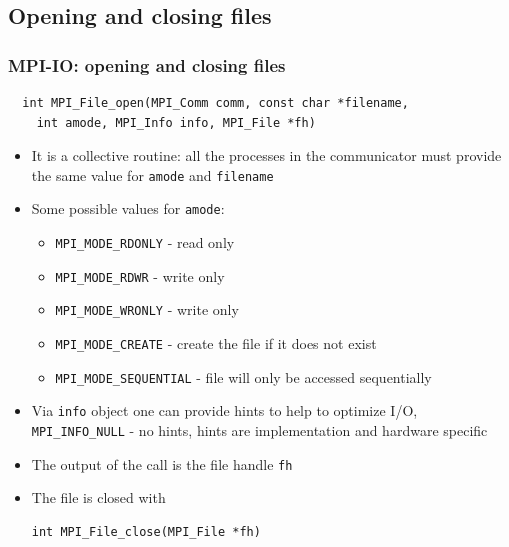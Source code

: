 \documentclass{beamer}
\begin{document}
\subsection{Opening and closing files}
\begin{frame}[fragile]
  \frametitle{MPI-IO: opening and closing files}
{\color{mycolorcode}
\begin{verbatim}
  int MPI_File_open(MPI_Comm comm, const char *filename, 
    int amode, MPI_Info info, MPI_File *fh)
\end{verbatim}
}
\begin{itemize}
\item It is a collective routine: all the processes in the communicator must provide the same value for {\color{mycolorcode}\verb|amode|} and {\color{mycolorcode}\verb|filename|}
\item Some possible values for {\color{mycolorcode}\verb|amode|}:
{\color{mycolorcode}
\begin{itemize}
\item {\color{mycolorcode}\verb|MPI_MODE_RDONLY|} - read only
\item {\color{mycolorcode}\verb|MPI_MODE_RDWR|} - write only
\item {\color{mycolorcode} \verb|MPI_MODE_WRONLY|} - write only
\item {\color{mycolorcode}\verb|MPI_MODE_CREATE|} - create the file if it does not exist
\item {\color{mycolorcode}\verb|MPI_MODE_SEQUENTIAL|} - file will only be accessed sequentially
\end{itemize}
}
\item Via {\color{mycolorcode}\verb|info|} object one can provide hints to help to optimize I/O, {\color{mycolorcode}\verb|MPI_INFO_NULL|} - no hints, hints are implementation and hardware specific 
\item The output of the call is the file handle {\color{mycolorcode}\verb|fh|}
\item The file is closed with
{\color{mycolorcode}
\begin{verbatim}
int MPI_File_close(MPI_File *fh)
\end{verbatim}
}
\end{itemize}
\end{frame}
\end{document}
